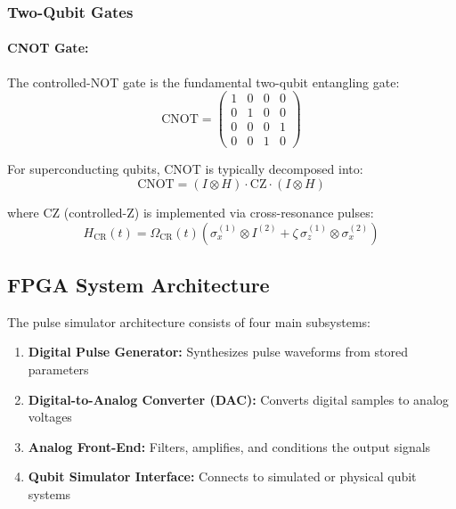 \documentclass[12pt,a4paper]{article}
\theoremstyle{definition}
\begin{document}
\subsubsection{Two-Qubit Gates}

\paragraph{CNOT Gate:}
The controlled-NOT gate is the fundamental two-qubit entangling gate:
\begin{equation}
\text{CNOT} = \begin{pmatrix} 
1 & 0 & 0 & 0 \\
0 & 1 & 0 & 0 \\
0 & 0 & 0 & 1 \\
0 & 0 & 1 & 0
\end{pmatrix}
\label{eq:cnot}
\end{equation}

For superconducting qubits, CNOT is typically decomposed into:
\begin{equation}
\text{CNOT} = (I \otimes H) \cdot \text{CZ} \cdot (I \otimes H)
\label{eq:cnot_decomp}
\end{equation}

where CZ (controlled-Z) is implemented via cross-resonance pulses:
\begin{equation}
H_{\text{CR}}(t) = \Omega_{\text{CR}}(t) \left(\sigma_x^{(1)} \otimes I^{(2)} + \zeta \, \sigma_z^{(1)} \otimes \sigma_x^{(2)}\right)
\label{eq:cr_hamiltonian}
\end{equation}

\subsection{FPGA System Architecture}

The pulse simulator architecture consists of four main subsystems:

\begin{enumerate}
    \item \textbf{Digital Pulse Generator:} Synthesizes pulse waveforms from stored parameters
    \item \textbf{Digital-to-Analog Converter (DAC):} Converts digital samples to analog voltages
    \item \textbf{Analog Front-End:} Filters, amplifies, and conditions the output signals
    \item \textbf{Qubit Simulator Interface:} Connects to simulated or physical qubit systems
\end{enumerate}
\end{document}
